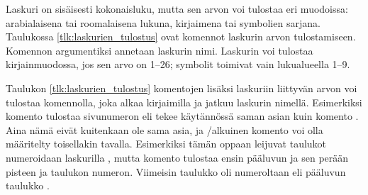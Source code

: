 \begin{koodilohkosis}
  \setcounter{oma}{3}    %
  \addtocounter{oma}{1}  %
  \addtocounter{oma}{-1} %
\end{koodilohkosis}

Laskuri on sisäisesti kokonaisluku, mutta sen arvon voi tulostaa eri
muodoissa: arabialaisena tai roomalaisena lukuna, kirjaimena tai
symbolien sarjana. Taulukossa \ref{tlk:laskurien_tulostus} ovat komennot
laskurin arvon tulostamiseen. Komennon argumentiksi annetaan laskurin
nimi. Laskurin voi tulostaa kirjainmuodossa, jos sen arvo on 1--26;
symbolit toimivat vain lu\-ku\-alueel\-la 1--9.


Taulukon \ref{tlk:laskurien_tulostus} komentojen lisäksi laskuriin
liittyvän arvon voi tulostaa komennolla, joka alkaa kirjaimilla
 ja jatkuu laskurin nimellä. Esimerkiksi komento
 tulostaa sivunumeron eli tekee käytännössä saman
asian kuin komento . Aina nämä eivät
kuitenkaan ole sama asia, ja \-/alkuinen komento voi
olla määritelty toisellakin tavalla. Esimerkiksi tämän oppaan leijuvat
taulukot numeroidaan laskurilla , mutta komento
 tulostaa ensin pääluvun ja sen perään pisteen
ja taulukon numeron. Viimeisin taulukko oli numeroltaan \thetable{} eli
pääluvun  taulukko .

